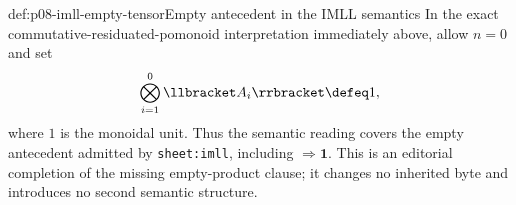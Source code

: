 \begin{hbconvention}{def:p08-imll-empty-tensor}{Empty antecedent in the IMLL semantics}
In the exact commutative-residuated-pomonoid interpretation immediately above,
allow \(n=0\) and set
\[
  \bigotimes_{i=1}^{0}\llbracket A_i\rrbracket\defeq 1,
\]
where \(1\) is the monoidal unit.  Thus the semantic reading covers the empty
antecedent admitted by \texttt{sheet:imll}, including
\(\Rightarrow\mathbf 1\).  This is an editorial completion of the missing
empty-product clause; it changes no inherited byte and introduces no second
semantic structure.
\end{hbconvention}
